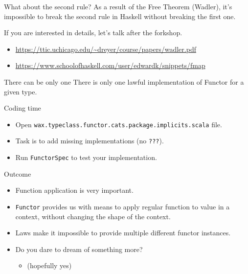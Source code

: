 \documentclass[presentation,aspectratio=169,smaller]{beamer}
\begin{document}
\begin{frame}[label={sec:org9c459f7}]{What about the second rule?}
As a result of the Free Theorem (Wadler), it's impossible to break the second
rule in Haskell without breaking the first one.

If you are interested in details, let's talk after the forkshop.

\begin{itemize}
\item \url{https://ttic.uchicago.edu/\~dreyer/course/papers/wadler.pdf}
\item \url{https://www.schoolofhaskell.com/user/edwardk/snippets/fmap}
\end{itemize}
\end{frame}

\begin{frame}[label={sec:org3425904}]{There can be only one}
There is only one lawful implementation of Functor for a given type.
\end{frame}

\begin{frame}[label={sec:org63a86fd},fragile]{Coding time}
 \begin{itemize}
\item Open \texttt{wax.typeclass.functor.cats.package.implicits.scala} file.
\item Task is to add missing implementations (no \texttt{???}).
\item Run \texttt{FunctorSpec} to test your implementation.
\end{itemize}
\end{frame}

\begin{frame}[label={sec:org81459e0},fragile]{Outcome}
 \begin{itemize}
\item Function application is very important.
\item \texttt{Functor} provides us with means to apply regular function to value in a
context, without changing the shape of the context.
\item Laws make it impossible to provide multiple different functor instances.
\item Do you dare to dream of something more?
\begin{itemize}
\item <2-> (hopefully yes)
\end{itemize}
\end{itemize}
\end{frame}
\end{document}
